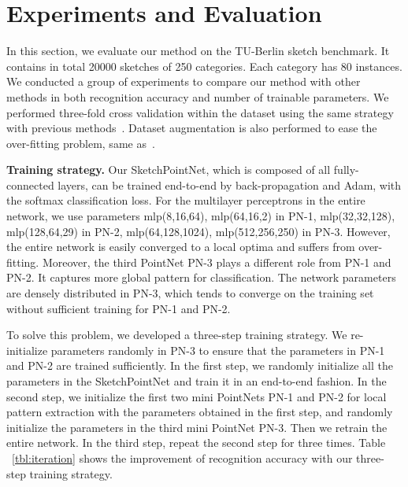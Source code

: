 \section{Experiments and Evaluation}
\label{sec:experiments}

In this section, we evaluate our method on the TU-Berlin sketch benchmark.
%
It contains in total 20000 sketches of 250 categories. Each category has 80 instances.
%
We conducted a group of experiments to compare our method with other methods in both recognition accuracy and number of trainable parameters.
%
We performed three-fold cross validation within the dataset using
the same strategy with previous methods~\cite{Yu2015SketchaNetTB, Dupont2016DeepSketch2D}.
Dataset augmentation is also performed to ease the over-fitting problem, same as~\cite{Yu2015SketchaNetTB}.


\noindent \textbf{Training strategy.}
%
Our SketchPointNet, which is composed of all fully-connected layers, can be trained end-to-end by back-propagation and Adam, with the softmax classification loss.
%
For the multilayer perceptrons in the entire network, we use parameters mlp(8,16,64), mlp(64,16,2) in PN-1, mlp(32,32,128), mlp(128,64,29) in PN-2, mlp(64,128,1024), mlp(512,256,250) in PN-3.
%
However, the entire network is easily converged to a local optima and suffers from over-fitting.
Moreover, the third PointNet PN-3 plays a different role from PN-1 and PN-2. It captures more global pattern for classification.
%
The network parameters are densely distributed in PN-3, which tends to converge on the training set without sufficient training for PN-1 and PN-2.


To solve this problem, we developed a three-step training strategy.
%
We re-initialize parameters randomly in PN-3 to ensure that the parameters in PN-1 and PN-2 are trained sufficiently.
%
In the first step, we randomly initialize all the parameters in the SketchPointNet and train it in an end-to-end fashion.
%
In the second step, we initialize the first two mini PointNets PN-1 and PN-2 for local pattern extraction with the parameters obtained in the first step, and randomly initialize the parameters in the third mini PointNet PN-3. Then we retrain the entire network.
%
In the third step, repeat the second step for three times.
%
Table ~\ref{tbl:iteration} shows the improvement of recognition accuracy with our three-step training strategy.


